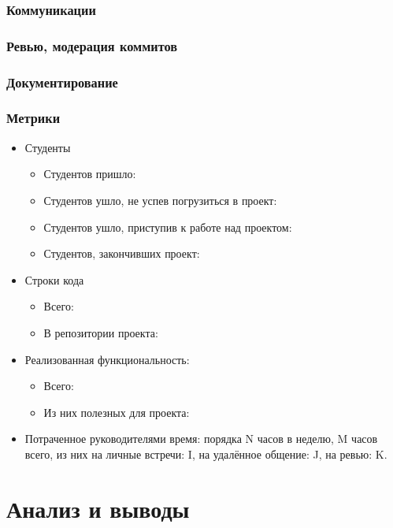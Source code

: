 \documentclass[a5paper]{article}
\begin{document}
\subsubsection{Коммуникации}

\subsubsection{Ревью, модерация коммитов}

\subsubsection{Документирование}

\subsubsection{Метрики}
\begin{itemize}
	\item Студенты
		\begin{itemize}
			\item Студентов пришло: 
			\item Студентов ушло, не успев погрузиться в проект:
			\item Студентов ушло, приступив к работе над проектом:
			\item Студентов, закончивших проект:
		\end{itemize}
	\item Строки кода
		\begin{itemize}
			\item Всего:
			\item В репозитории проекта:
		\end{itemize}
	\item Реализованная функциональность:
		\begin{itemize}
			\item Всего: 
			\item Из них полезных для проекта: 
		\end{itemize}
	\item Потраченное руководителями время: порядка N часов в неделю, M часов всего, из них на личные встречи: I, на удалённое общение: J, на ревью: K.
\end{itemize}



\section{Анализ и выводы}
\end{document}
